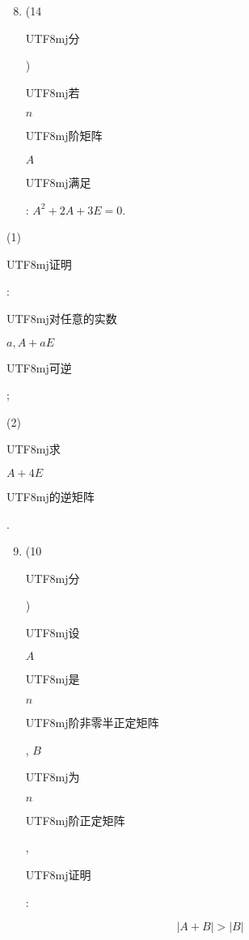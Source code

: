 \documentclass[10pt]{article}
\begin{document}
\begin{enumerate}
  \setcounter{enumi}{7}
  \item (14 \begin{CJK}{UTF8}{mj}分\end{CJK}) \begin{CJK}{UTF8}{mj}若\end{CJK} $n$ \begin{CJK}{UTF8}{mj}阶矩阵\end{CJK} $A$ \begin{CJK}{UTF8}{mj}满足\end{CJK}: $A^{2}+2 A+3 E=0$.
\end{enumerate}
(1) \begin{CJK}{UTF8}{mj}证明\end{CJK}: \begin{CJK}{UTF8}{mj}对任意的实数\end{CJK} $a, A+a E$ \begin{CJK}{UTF8}{mj}可逆\end{CJK};

(2) \begin{CJK}{UTF8}{mj}求\end{CJK} $A+4 E$ \begin{CJK}{UTF8}{mj}的逆矩阵\end{CJK}.

\begin{enumerate}
  \setcounter{enumi}{8}
  \item (10 \begin{CJK}{UTF8}{mj}分\end{CJK}) \begin{CJK}{UTF8}{mj}设\end{CJK} $A$ \begin{CJK}{UTF8}{mj}是\end{CJK} $n$ \begin{CJK}{UTF8}{mj}阶非零半正定矩阵\end{CJK}, $B$ \begin{CJK}{UTF8}{mj}为\end{CJK} $n$ \begin{CJK}{UTF8}{mj}阶正定矩阵\end{CJK}, \begin{CJK}{UTF8}{mj}证明\end{CJK}:
\end{enumerate}
$$
|A+B|>|B|
$$
\end{document}
